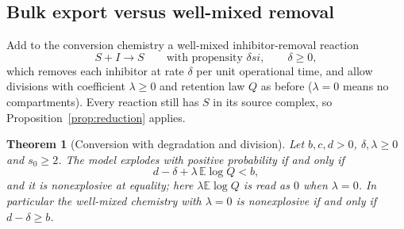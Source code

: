 \documentclass[11pt,a4paper]{article}
\numberwithin{equation}{section}
\newtheorem{theorem}{Theorem}[section]
\theoremstyle{definition}\newtheorem{definition}[theorem]{Definition}
\theoremstyle{remark}\newtheorem{remark}[theorem]{Remark}\newtheorem{example}[theorem]{Example}
\newcommand{\E}{\mathbb E}
\begin{document}
\subsection{Bulk export versus well-mixed removal}
Add to the conversion chemistry a well-mixed inhibitor-removal reaction
\begin{equation}\label{eq:degradation}
S+I\longrightarrow S\qquad\text{with propensity }\delta si,\qquad\delta\ge0,
\end{equation}
which removes each inhibitor at rate $\delta$ per unit operational time, and allow divisions with coefficient $\lambda\ge0$ and retention law $Q$ as before ($\lambda=0$ means no compartments). Every reaction still has $S$ in its source complex, so Proposition~\ref{prop:reduction} applies.

\begin{theorem}[Conversion with degradation and division]\label{thm:degradation}
Let $b,c,d>0$, $\delta,\lambda\ge0$ and $s_0\ge2$. The model explodes with positive probability if and only if
\begin{equation}\label{eq:degr-threshold}
d-\delta+\lambda\,\E\log Q<b ,
\end{equation}
and it is nonexplosive at equality; here $\lambda\E\log Q$ is read as $0$ when $\lambda=0$. In particular the well-mixed chemistry with $\lambda=0$ is nonexplosive if and only if $d-\delta\ge b$.
\end{theorem}
\end{document}
